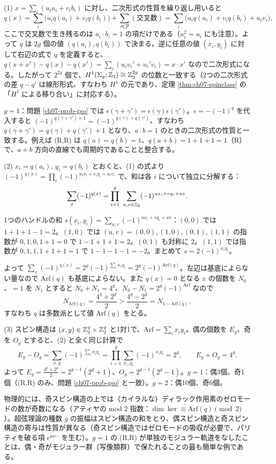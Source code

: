 \begin{solution}
(1) $x=\sum_i(u_ia_i+v_ib_i)$ に対し、二次形式の性質を繰り返し用いると
\[
q(x)=\sum_i\bigl(u_iq(a_i)+v_iq(b_i)\bigr)+\sum_{\text{ペア}}(\text{交叉数})=\sum_i\bigl(u_iq(a_i)+v_iq(b_i)+u_iv_i\bigr),
\]
ここで交叉数で生き残るのは $a_i\cdot b_i=1$ の項だけである（$u_i^2=u_i$ にも注意）。よって $q$ は $2g$ 個の値 $(q(a_i),q(b_i))$ で決まる。逆に任意の値 $(x_i,y_i)$ に対して右辺の式で $q$ を定義すると、$q(x+x')-q(x)-q(x')=\sum_i(u_iv_i'+u_i'v_i)=x\cdot x'$ なので二次形式になる。したがって $2^{2g}$ 個で、$H^1(\Sigma_g;\mathbb{Z}_2)\cong\mathbb{Z}_2^{2g}$ の位数と一致する（2つの二次形式の差 $q-q'$ は線形形式、すなわち $H^1$ の元であり、定理 \ref{thm:ch07-spinclass} の「$H^1$ による移り合い」に対応する）。

$g=1$：問題 \ref{ch07-prob-gso} では $\epsilon(\gamma+\gamma')=\epsilon(\gamma)\epsilon(\gamma')$。$\epsilon=-(-1)^q$ を代入すると $(-1)^{q(\gamma+\gamma')+1}=(-1)^{q(\gamma)+q(\gamma')}$、すなわち $q(\gamma+\gamma')=q(\gamma)+q(\gamma')+1$ となり、$a\cdot b=1$ のときの二次形式の性質と一致する。例えば (R,R) は $q(a)=q(b)=1$、$q(a+b)=1+1+1=1$（R）で、$a+b$ 方向の直線でも周期的であることと整合する。

(2) $x_i=q(a_i)$, $y_i=q(b_i)$ とおくと、(1) の式より $(-1)^{q(x)}=\prod_i(-1)^{u_ix_i+v_iy_i+u_iv_i}$ で、和は各 $i$ について独立に分解する：
\[
\sum_{x}(-1)^{q(x)}=\prod_{i=1}^g\ \sum_{u,v\in\Z_2}(-1)^{ux_i+vy_i+uv}.
\]
\begin{note}
1つのハンドルの和 $s(x_i,y_i)=\sum_{u,v}(-1)^{ux_i+vy_i+uv}$：$(0,0)$ では $1+1+1-1=2$。$(1,0)$ では $(u,v)=(0,0),(1,0),(0,1),(1,1)$ の指数が $0,1,0,1+1=0$ で $1-1+1+1=2$。$(0,1)$ も対称に $2$。$(1,1)$ では指数が $0,1,1,1+1+1=1$ で $1-1-1-1=-2$。まとめて $s=2(-1)^{x_iy_i}$。
\end{note}
よって $\sum_x(-1)^{q(x)}=2^g(-1)^{\sum_ix_iy_i}=2^g(-1)^{\mathrm{Arf}(q)}$。左辺は基底によらない量なので $\mathrm{Arf}(q)$ も基底によらない。また $q(x)=0$ となる $x$ の個数を $N_0$、$=1$ を $N_1$ とすると $N_0+N_1=4^g$、$N_0-N_1=2^g(-1)^{\mathrm{Arf}}$ なので
\[
N_{\mathrm{Arf}(q)}=\frac{4^g+2^g}{2}>\frac{4^g-2^g}{2}=N_{1-\mathrm{Arf}(q)},
\]
すなわち $q$ は多数派として値 $\mathrm{Arf}(q)$ をとる。

(3) スピン構造は $(x,y)\in\mathbb{Z}_2^g\times\mathbb{Z}_2^g$ と1対1で、$\mathrm{Arf}=\sum_ix_iy_i$。偶の個数を $E_g$、奇を $O_g$ とすると、(2) と全く同じ計算で
\[
E_g-O_g=\sum_{x,y}(-1)^{\sum_ix_iy_i}=\prod_{i=1}^g\sum_{x_i,y_i}(-1)^{x_iy_i}=2^g,\qquad E_g+O_g=4^g .
\]
よって $E_g=\frac{4^g+2^g}2=2^{g-1}(2^g+1)$、$O_g=2^{g-1}(2^g-1)$。$g=1$：偶3個、奇1個（(R,R) のみ、問題 \ref{ch07-prob-gso} と一致）。$g=2$：偶10個、奇6個。

物理的には、奇スピン構造の上では（カイラルな）ディラック作用素のゼロモードの数が奇数になる（アティヤの mod 2 指数：$\dim\ker\equiv\mathrm{Arf}(q)\pmod2$）。超弦理論の種数 $g$ の振幅はスピン構造の和をとり、偶スピン構造と奇スピン構造の寄与は性質が異なる（奇スピン構造ではゼロモードの吸収が必要で、パリティを破る項 $\epsilon^{\mu\nu\cdots}$ を生む）。$g=1$ の (R,R) が単独のモジュラー軌道をなしたことは、偶・奇がモジュラー群（写像類群）で保たれることの最も簡単な例である。
\end{solution}

